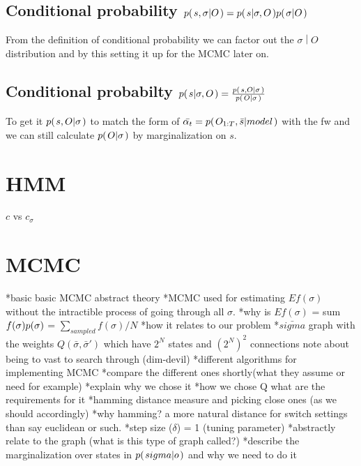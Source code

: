 \documentclass[a4paper,11pt]{kth-mag}
\begin{document}
            \subsection{
                Conditional probability 
                $p{(\left. s,\sigma \middle\vert O \right.)}
                =
                p{(\left. s \middle\vert \sigma,O \right.)}p{(\left. \sigma \middle\vert O \right.)}
            $}
                From the definition of conditional probability we can factor out
                the $\left.\sigma \middle\vert O\right.$ distribution and by this setting it up for the MCMC later on.

            \subsection{
                Conditional probabilty 
                $p{(\left. s \middle\vert \sigma,O \right.)}
                =
                \frac{
                    p{(\left. s,O \middle\vert \sigma \right.)}
                }{
                    p{(\left. O \middle\vert \sigma \right.)}}
            $}
                To get it $p{(\left. s,O \middle\vert \sigma \right.)}$ to match the form of $\bar{\alpha_t}=p{(\left. O_{1:T},\bar{s} \middle\vert model \right.)}$ with the fw and we can still calculate $p{(\left. O \middle\vert \sigma \right.)}$ by marginalization on $s$.

        \section{HMM}
            
                $c$ vs $c_{\sigma}$
            
        \section{MCMC}
            *basic basic MCMC abstract theory
            *MCMC used for estimating $E{f(\sigma)}$ without the intractible process of going through all
            $\sigma$.
            *why is $E{f(\sigma)}$ = 
            sum $f(\sigma)p{(\sigma)}$ = $\sum_{sampled} f(\sigma)/N$
            *how it relates to our problem
                *$\bar{sigma}$ graph with the weights $Q(\bar{\sigma},\bar{\sigma}')$
                which have $2^N$ states and $(2^N)^2$ connections
                note about being to vast to search through (dim-devil)
            *different algorithms for implementing MCMC
            *compare the different ones shortly(what they assume or
            need for example)
            *explain why we chose it
            *how we chose Q what are the requirements for it
                *hamming distance measure and picking close ones (as we should
                accordingly)
                *why hamming? a more natural distance for switch settings than
                say euclidean or such.
                *step size ($\delta$) = 1 (tuning parameter)
            *abstractly relate to the graph (what is this type of graph
            called?)
        *describe the marginalization over states in $p{(\left. sigma \middle\vert o \right.)}$ and why we need
        to do it
\end{document}
